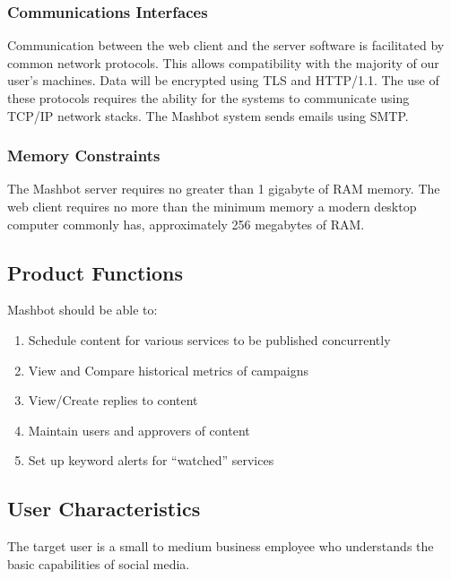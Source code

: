 \documentclass{report}
\begin{document}
		\subsubsection{Communications Interfaces} %
                   Communication between the web client and the
                   server software is facilitated by common network
                   protocols. This allows compatibility with the
                   majority of our user's machines.  Data will
                   be encrypted using TLS and HTTP/1.1. The use of
                   these protocols requires the ability for the
                   systems to communicate using TCP/IP network stacks.
                   The Mashbot system sends emails using SMTP.

		\subsubsection{Memory Constraints} %
                The Mashbot server requires no greater than 1 gigabyte
                of RAM memory. The web client requires no more than
                the minimum memory a modern desktop computer commonly
                has, approximately 256 megabytes of RAM.

	\subsection{Product Functions} %
        Mashbot should be able to:
        \begin{enumerate}
          \item Schedule content for various services to be
            published concurrently
          \item View and Compare historical metrics of campaigns
          \item View/Create replies to content
          \item Maintain users and approvers of content
          \item Set up keyword alerts for ``watched'' services
        \end{enumerate}
	\subsection{User Characteristics} %
        The target user is a small to medium business employee who understands
        the basic capabilities of social media.
        
\end{document}
